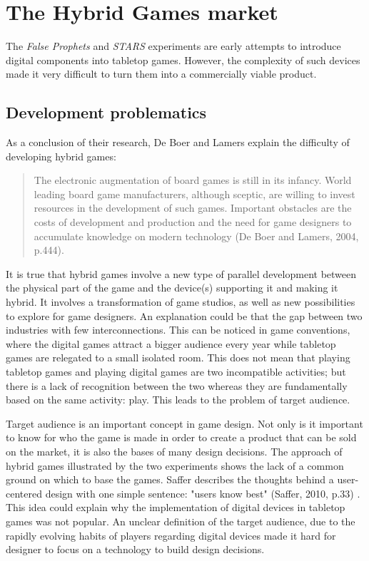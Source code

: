 \section{The Hybrid Games market}
The \textit{False Prophets} and \textit{STARS} experiments are early attempts to introduce digital components into tabletop games. However, the complexity of such devices made it very difficult to turn them into a commercially viable product. 
\subsection{Development problematics}
As a conclusion of their research, De Boer and Lamers explain the difficulty of developing hybrid games:
\begin{quotation}
The electronic augmentation of board games is still in its infancy. World leading board game manufacturers, although sceptic, are willing to invest resources in the development of such games. Important obstacles are the costs of development and production and the need for game designers to accumulate knowledge on modern technology (De Boer and Lamers, 2004, p.444)\cite{chap:aug}.
\end{quotation}
It is true that hybrid games involve a new type of parallel development between the physical part of the game and the device(s) supporting it and making it hybrid. It involves a transformation of game studios, as well as new possibilities to explore for game designers. An explanation could be that the gap between two industries with few interconnections. This can be noticed in game conventions, where the digital games attract a bigger audience every year while tabletop games are relegated to a small isolated room. This does not mean that playing tabletop games and playing digital games are two incompatible activities; but there is a lack of recognition between the two whereas they are fundamentally based on the same activity: play. This leads to the problem of target audience.

Target audience is an important concept in game design. Not only is it important to know for who the game is made in order to create a product that can be sold on the market, it is also the bases of many design decisions. The approach of hybrid games illustrated by the two experiments shows the lack of a common ground on which to base the games. Saffer describes the thoughts behind a user-centered design with one simple sentence: "users know best" (Saffer, 2010, p.33) \cite{book:id}. This idea could explain why the implementation of digital devices in tabletop games was not popular.  An unclear definition of the target audience, due to the rapidly evolving habits of players regarding digital devices made it hard for designer to focus on a technology to build design decisions.

